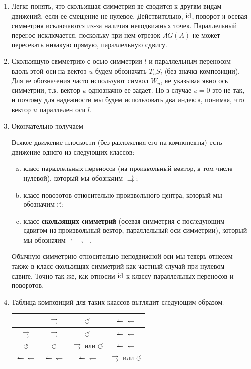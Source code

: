 \begin{enumerate}
\item Легко понять, что скользящая симметрия не сводится к другим видам движений, если ее смещение не нулевое. Действительно, $\mathrm{id}$, поворот и осевая симметрия исключаются из-за наличия неподвижных точек. Параллельный перенос исключается, поскольку при нем отрезок $AG(A)$ не может пересекать никакую прямую, параллельную сдвигу.

\item Скользящую симметрию с осью симметрии $l$ и параллельным переносом вдоль этой оси на вектор $u$ будем обозначать $T_uS_l$ (без значка композиции). Для ее обозначения часто используют символ $W_u$, не указывая явно ось симметрии, т.к. вектор $u$ однозначно ее задает. Но в случае $u=0$ это не так, и поэтому для надежности мы будем использовать два индекса, понимая, что вектор $u$ параллелен оси $l$.

\item Окончательно получаем
\begin{thrm} Всякое движение плоскости (без разложения его на компоненты) есть движение одного из следующих классов:
\begin{enumerate}[a)]
\item класс параллельных переносов (на произвольный вектор, в том числе нулевой), который мы обозначим $\rightrightarrows$;
\item класс поворотов относительно произвольного центра, который мы обозначим $\circlearrowleft$;
\item класс \textbf{скользящих симметрий} (осевая симметрия с последующим сдвигом на произвольный вектор, параллельный оси симметрии), который мы обозначим $\leftharpoonup\leftharpoondown$.
\end{enumerate}
\end{thrm}
Обычную симметрию относительно неподвижной оси мы теперь отнесем также в класс скользящих симметрий как частный случай при нулевом сдвиге. Точно так же, как относим $\mathrm{id}$ к классу параллельных переносов и поворотов.

\item Таблица композиций для таких классов выглядит следующим образом:
\begin{center}
\begin{tabular}{c|ccc}
 & $\rightrightarrows$ & $\circlearrowleft$ &  $\leftharpoonup\leftharpoondown$ \\ \hline
$\rightrightarrows$ & $\rightrightarrows$ &  $\circlearrowleft$ &  $\leftharpoonup\leftharpoondown$  \\ 
$\circlearrowleft$ & $\circlearrowleft$ & $\rightrightarrows$ или $\circlearrowleft$ & $\leftharpoonup\leftharpoondown$  \\ 
$\leftharpoonup\leftharpoondown$ & $\leftharpoonup\leftharpoondown$ & $\leftharpoonup\leftharpoondown$ & $\rightrightarrows$ или $\circlearrowleft$  \\ 
\end{tabular}
\end{center}


\end{enumerate}

